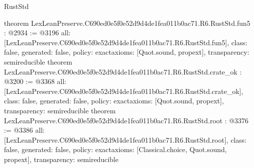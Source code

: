 \begin{lexlean}{RustStd}
\begin{coremodule}
{}
theorem LexLeanPreserve.C690ed0e5f0e52d9d4de1fea011b0ac71.R6.RustStd.fun5 : @2934 := @3196 {
  all: [LexLeanPreserve.C690ed0e5f0e52d9d4de1fea011b0ac71.R6.RustStd.fun5],
  class: false,
  generated: false,
  policy: exact{axioms: [Quot.sound, propext]},
  transparency: semireducible
}
theorem LexLeanPreserve.C690ed0e5f0e52d9d4de1fea011b0ac71.R6.RustStd.crate_ok : @3200 := @3368 {
  all: [LexLeanPreserve.C690ed0e5f0e52d9d4de1fea011b0ac71.R6.RustStd.crate_ok],
  class: false,
  generated: false,
  policy: exact{axioms: [Quot.sound, propext]},
  transparency: semireducible
}
theorem LexLeanPreserve.C690ed0e5f0e52d9d4de1fea011b0ac71.R6.RustStd.root : @3376 := @3386 {
  all: [LexLeanPreserve.C690ed0e5f0e52d9d4de1fea011b0ac71.R6.RustStd.root],
  class: false,
  generated: false,
  policy: exact{axioms: [Classical.choice, Quot.sound, propext]},
  transparency: semireducible
}


\end{coremodule}
\end{lexlean}
